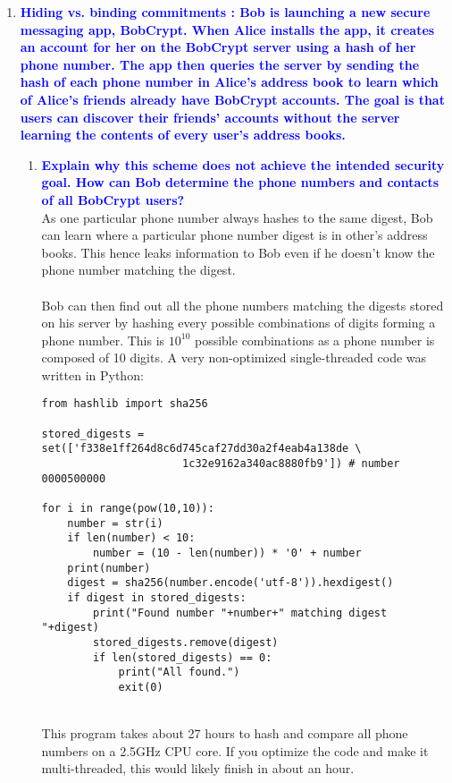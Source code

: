 \documentclass[11pt]{article}
\begin{document}
\begin{enumerate}
\item \textbf{\textcolor{blue}{Hiding vs. binding commitments : Bob is launching a new secure messaging app, BobCrypt. When Alice installs the app, it creates an account for her on the BobCrypt server using a hash of her phone number. The app then queries the server by sending the hash of each phone number in Alice’s address book to learn which of Alice’s friends already have BobCrypt accounts. The goal is that users can discover their friends’ accounts without the server learning the contents of every user’s address books.}}
    \begin{enumerate}
    \item \textbf{\textcolor{blue}{Explain why this scheme does not achieve the intended security goal. How can Bob determine the phone numbers and contacts of all BobCrypt users?}}
        \\ As one particular phone number always hashes to the same digest, Bob can learn where a particular phone number digest is in other's address books. This hence leaks information to Bob even if he doesn't know the phone number matching the digest.
        \\\\ Bob can then find out all the phone numbers matching the digests stored on his server by hashing every possible combinations of digits forming a phone number. This is $10^10$ possible combinations as a phone number is composed of 10 digits. A very non-optimized single-threaded code was written in Python:
        
        \begin{verbatim}
from hashlib import sha256

stored_digests = set(['f338e1ff264d8c6d745caf27dd30a2f4eab4a138de \
                      1c32e9162a340ac8880fb9']) # number 0000500000

for i in range(pow(10,10)):
    number = str(i)
    if len(number) < 10:
        number = (10 - len(number)) * '0' + number
    print(number)
    digest = sha256(number.encode('utf-8')).hexdigest()
    if digest in stored_digests:
        print("Found number "+number+" matching digest "+digest)
        stored_digests.remove(digest)
        if len(stored_digests) == 0:
            print("All found.")
            exit(0)
        \end{verbatim}
        
    \leavevmode
    \\ This program takes about 27 hours to hash and compare all phone numbers on a 2.5GHz CPU core. If you optimize the code and make it multi-threaded, this would likely finish in about an hour.
    

\end{enumerate}
\end{enumerate}
\end{document}
